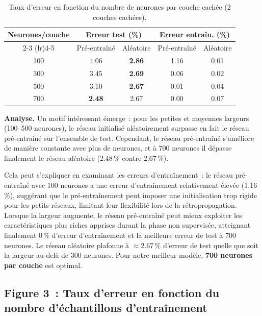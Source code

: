 \documentclass[11pt,a4paper]{article}
\begin{document}
\begin{table}[H]
\centering
\caption{Taux d'erreur en fonction du nombre de neurones par couche cach\'ee (2 couches cach\'ees).}
\label{tab:fig2}
\begin{tabular}{ccccc}
\toprule
Neurones/couche & \multicolumn{2}{c}{Erreur test (\%)} & \multicolumn{2}{c}{Erreur entra\^in. (\%)} \\
\cmidrule(lr){2-3} \cmidrule(lr){4-5}
 & Pr\'e-entra\^in\'e & Al\'eatoire & Pr\'e-entra\^in\'e & Al\'eatoire \\
\midrule
100 & 4.06 & \textbf{2.86} & 1.16 & 0.01 \\
300 & 3.45 & \textbf{2.69} & 0.06 & 0.02 \\
500 & 3.10 & \textbf{2.67} & 0.01 & 0.04 \\
700 & \textbf{2.48} & 2.67 & 0.00 & 0.07 \\
\bottomrule
\end{tabular}
\end{table}

\textbf{Analyse.} Un motif int\'eressant \'emerge~: pour les petites et moyennes largeurs (100--500 neurones), le r\'eseau initialis\'e al\'eatoirement surpasse en fait le r\'eseau pr\'e-entra\^in\'e sur l'ensemble de test. Cependant, le r\'eseau pr\'e-entra\^in\'e s'am\'eliore de mani\`ere constante avec plus de neurones, et \`a 700 neurones il d\'epasse finalement le r\'eseau al\'eatoire (2.48\,\% contre 2.67\,\%).

Cela peut s'expliquer en examinant les erreurs d'entra\^inement~: le r\'eseau pr\'e-entra\^in\'e avec 100 neurones a une erreur d'entra\^inement relativement \'elev\'ee (1.16\,\%), sugg\'erant que le pr\'e-entra\^inement peut imposer une initialisation trop rigide pour les petits r\'eseaux, limitant leur flexibilit\'e lors de la r\'etropropagation. Lorsque la largeur augmente, le r\'eseau pr\'e-entra\^in\'e peut mieux exploiter les caract\'eristiques plus riches apprises durant la phase non supervis\'ee, atteignant finalement 0\,\% d'erreur d'entra\^inement et la meilleure erreur de test \`a 700 neurones. Le r\'eseau al\'eatoire plafonne \`a $\approx 2.67\,\%$ d'erreur de test quelle que soit la largeur au-del\`a de 300 neurones. Pour notre meilleur mod\`ele, \textbf{700 neurones par couche} est optimal.

\subsection{Figure 3~: Taux d'erreur en fonction du nombre d'\'echantillons d'entra\^inement}
\end{document}
